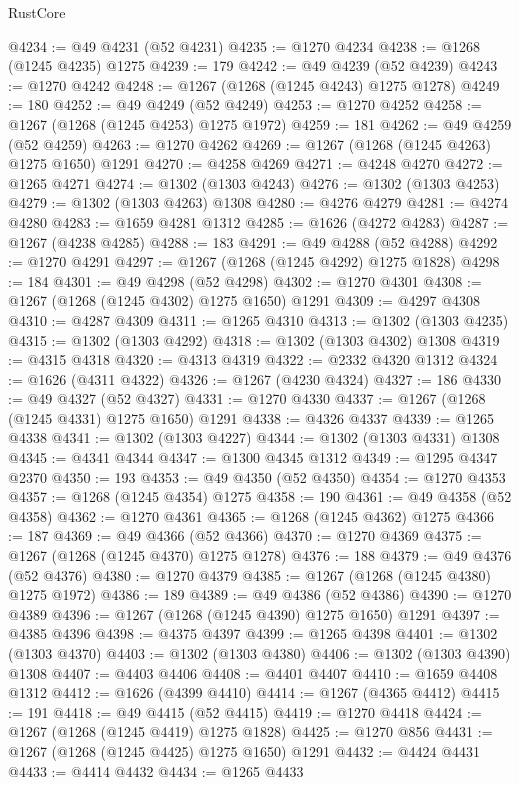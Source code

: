 \begin{lexlean}{RustCore}
\begin{coremodule}
@4234 := @49 @4231 (@52 @4231)
@4235 := @1270 @4234
@4238 := @1268 (@1245 @4235) @1275
@4239 := 179
@4242 := @49 @4239 (@52 @4239)
@4243 := @1270 @4242
@4248 := @1267 (@1268 (@1245 @4243) @1275 @1278)
@4249 := 180
@4252 := @49 @4249 (@52 @4249)
@4253 := @1270 @4252
@4258 := @1267 (@1268 (@1245 @4253) @1275 @1972)
@4259 := 181
@4262 := @49 @4259 (@52 @4259)
@4263 := @1270 @4262
@4269 := @1267 (@1268 (@1245 @4263) @1275 @1650) @1291
@4270 := @4258 @4269
@4271 := @4248 @4270
@4272 := @1265 @4271
@4274 := @1302 (@1303 @4243)
@4276 := @1302 (@1303 @4253)
@4279 := @1302 (@1303 @4263) @1308
@4280 := @4276 @4279
@4281 := @4274 @4280
@4283 := @1659 @4281 @1312
@4285 := @1626 (@4272 @4283)
@4287 := @1267 (@4238 @4285)
@4288 := 183
@4291 := @49 @4288 (@52 @4288)
@4292 := @1270 @4291
@4297 := @1267 (@1268 (@1245 @4292) @1275 @1828)
@4298 := 184
@4301 := @49 @4298 (@52 @4298)
@4302 := @1270 @4301
@4308 := @1267 (@1268 (@1245 @4302) @1275 @1650) @1291
@4309 := @4297 @4308
@4310 := @4287 @4309
@4311 := @1265 @4310
@4313 := @1302 (@1303 @4235)
@4315 := @1302 (@1303 @4292)
@4318 := @1302 (@1303 @4302) @1308
@4319 := @4315 @4318
@4320 := @4313 @4319
@4322 := @2332 @4320 @1312
@4324 := @1626 (@4311 @4322)
@4326 := @1267 (@4230 @4324)
@4327 := 186
@4330 := @49 @4327 (@52 @4327)
@4331 := @1270 @4330
@4337 := @1267 (@1268 (@1245 @4331) @1275 @1650) @1291
@4338 := @4326 @4337
@4339 := @1265 @4338
@4341 := @1302 (@1303 @4227)
@4344 := @1302 (@1303 @4331) @1308
@4345 := @4341 @4344
@4347 := @1300 @4345 @1312
@4349 := @1295 @4347 @2370
@4350 := 193
@4353 := @49 @4350 (@52 @4350)
@4354 := @1270 @4353
@4357 := @1268 (@1245 @4354) @1275
@4358 := 190
@4361 := @49 @4358 (@52 @4358)
@4362 := @1270 @4361
@4365 := @1268 (@1245 @4362) @1275
@4366 := 187
@4369 := @49 @4366 (@52 @4366)
@4370 := @1270 @4369
@4375 := @1267 (@1268 (@1245 @4370) @1275 @1278)
@4376 := 188
@4379 := @49 @4376 (@52 @4376)
@4380 := @1270 @4379
@4385 := @1267 (@1268 (@1245 @4380) @1275 @1972)
@4386 := 189
@4389 := @49 @4386 (@52 @4386)
@4390 := @1270 @4389
@4396 := @1267 (@1268 (@1245 @4390) @1275 @1650) @1291
@4397 := @4385 @4396
@4398 := @4375 @4397
@4399 := @1265 @4398
@4401 := @1302 (@1303 @4370)
@4403 := @1302 (@1303 @4380)
@4406 := @1302 (@1303 @4390) @1308
@4407 := @4403 @4406
@4408 := @4401 @4407
@4410 := @1659 @4408 @1312
@4412 := @1626 (@4399 @4410)
@4414 := @1267 (@4365 @4412)
@4415 := 191
@4418 := @49 @4415 (@52 @4415)
@4419 := @1270 @4418
@4424 := @1267 (@1268 (@1245 @4419) @1275 @1828)
@4425 := @1270 @856
@4431 := @1267 (@1268 (@1245 @4425) @1275 @1650) @1291
@4432 := @4424 @4431
@4433 := @4414 @4432
@4434 := @1265 @4433

\end{coremodule}
\end{lexlean}
